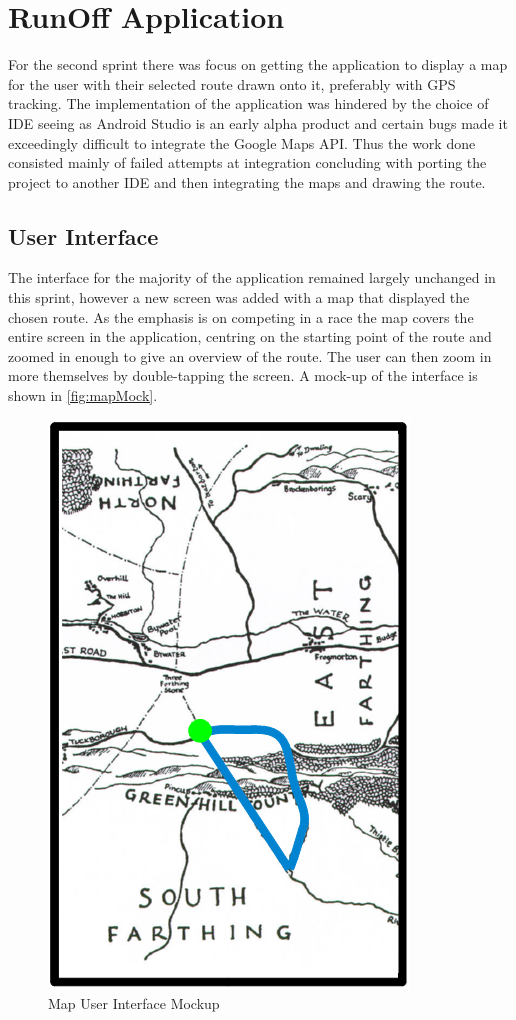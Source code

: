 \section{RunOff Application}
\label{sec:sprint2-app}
For the second sprint there was focus on getting the application to display a map for the user with their selected route drawn onto it, preferably with \ac{GPS} tracking. The implementation of the application was hindered by the choice of \ac{IDE} seeing as Android Studio is an early alpha product and certain bugs made it exceedingly difficult to integrate the Google Maps \ac{API}. Thus the work done consisted mainly of failed attempts at integration concluding with porting the project to another \ac{IDE} and then integrating the maps and drawing the route.

\subsection{User Interface}
The interface for the majority of the application remained largely unchanged in this sprint, however a new screen was added with a map that displayed the chosen route. As the emphasis is on competing in a race the map covers the entire screen in the application, centring on the starting point of the route and zoomed in enough to give an overview of the route. The user can then zoom in more themselves by double-tapping the screen. A mock-up of the interface is shown in \autoref{fig:mapMock}.

\begin{figure}[!ht]
	\begin{center}
		\includegraphics[scale=0.4]{img/mapMock.png}
		\caption{Map User Interface Mockup}
		\label{fig:mapMock}
	\end{center}
\end{figure}

